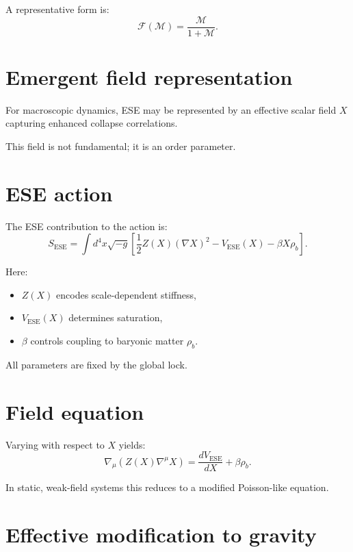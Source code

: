 \documentclass[11pt]{book}
\newcommand{\ESE}{\mathrm{ESE}}
\begin{document}
A representative form is:
\begin{equation}
\mathcal{F}(\mathcal{M}) =
\frac{\mathcal{M}}{1 + \mathcal{M}}.
\end{equation}

\section{Emergent field representation}

For macroscopic dynamics, ESE may be represented by an effective scalar
field $X$ capturing enhanced collapse correlations.

This field is not fundamental; it is an order parameter.

\section{ESE action}

The ESE contribution to the action is:
\begin{equation}
S_{\ESE}
=
\int d^4x \sqrt{-g}
\left[
\frac{1}{2} Z(X) (\nabla X)^2
-
V_{\ESE}(X)
-
\beta X \rho_b
\right].
\end{equation}

Here:
\begin{itemize}
\item $Z(X)$ encodes scale-dependent stiffness,
\item $V_{\ESE}(X)$ determines saturation,
\item $\beta$ controls coupling to baryonic matter $\rho_b$.
\end{itemize}

All parameters are fixed by the global lock.

\section{Field equation}

Varying with respect to $X$ yields:
\begin{equation}
\nabla_\mu\left(Z(X)\nabla^\mu X\right)
=
\frac{dV_{\ESE}}{dX}
+
\beta \rho_b.
\end{equation}

In static, weak-field systems this reduces to a modified Poisson-like
equation.

\section{Effective modification to gravity}
\end{document}
